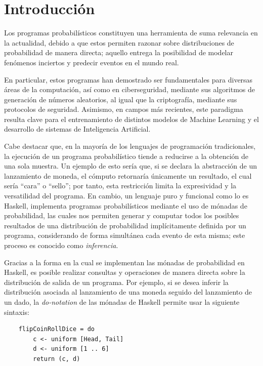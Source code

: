 
\section{Introducción}\label{sec:intro} 

Los programas probabilísticos constituyen una herramienta de suma relevancia en la actualidad, debido a que estos permiten razonar sobre distribuciones de probabilidad de manera directa; aquello entrega la posibilidad de modelar fenómenos inciertos y predecir eventos en el mundo real.

En particular, estos programas han demostrado ser fundamentales para diversas áreas de la computación, así como en ciberseguridad, mediante sus algoritmos de generación de números aleatorios, al igual que la criptografía,  mediante sus protocolos de seguridad. Asimismo, en campos más recientes,  este paradigma resulta clave para el entrenamiento de distintos modelos de Machine Learning y el desarrollo de sistemas de Inteligencia Artificial.

Cabe destacar que, en la mayoría de los lenguajes de programación tradicionales, la ejecución de un programa probabilístico tiende a reducirse a la obtención de una sola muestra. Un ejemplo de esto sería que, si se declara la abstracción de un lanzamiento de moneda, el cómputo retornaría únicamente un resultado, el cual sería “cara” o “sello”; por tanto, esta restricción limita la expresividad y la versatilidad del programa. En cambio, un lenguaje puro y funcional como lo es \textsf{Haskell}, implementa programas probabilísticos mediante el uso de mónadas de probabilidad, las cuales nos permiten generar y computar todos los posibles resultados de una distribución de probabilidad implícitamente definida por un programa, considerando de forma simultánea cada evento de esta misma; este proceso es conocido como \textit{inferencia}.

Gracias a la forma en la cual se implementan las mónadas de probabilidad en \textsf{Haskell}, es posible realizar consultas y operaciones de manera directa sobre la distribución de salida de un programa. Por ejemplo, si se desea inferir la distribución asociada al lanzamiento de una moneda seguido del lanzamiento de un dado, la \textit{do-notation} de las mónadas de \textsf{Haskell} permite usar la siguiente sintaxis:

\begin{verbatim}
    flipCoinRollDice = do 
        c <- uniform [Head, Tail]
        d <- uniform [1 .. 6]
        return (c, d)
\end{verbatim}

